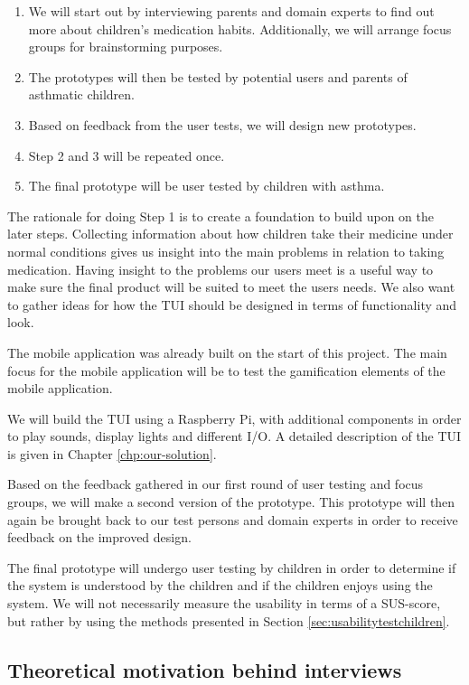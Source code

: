 \begin{enumerate}
  \item We will start out by interviewing parents and domain experts to find out more about children's medication habits. Additionally, we will arrange focus groups for brainstorming purposes.
  \item The prototypes will then be tested by potential users and parents of asthmatic children. 
  \item Based on feedback from the user tests, we will design new prototypes.
  \item Step 2 and 3 will be repeated once. 
  \item The final prototype will be user tested by children with asthma. 
\end{enumerate}
  
The rationale for doing Step 1 is to create a foundation to build upon on the later steps. 
Collecting information about how children take their medicine under normal conditions gives us insight into the main problems in relation to taking medication. Having insight to the problems our users meet is a useful way to make sure the final product will be suited to meet the users needs. We also want to gather ideas for how the TUI should be designed in terms of functionality and look.

The mobile application was already built on the start of this project. The main focus for the mobile application will be to test the gamification elements of the mobile application. 

We will build the TUI using a Raspberry Pi, with additional components in order to play sounds, display lights and different I/O. A detailed description of the TUI is given in Chapter \ref{chp:our-solution}. 


Based on the feedback gathered in our first round of user testing and focus groups, we will make a second version of the prototype. This prototype will then again be brought back to our test persons and domain experts in order to receive feedback on the improved design.

The final prototype will undergo user testing by children in order to determine if the system is understood by the children and if the children enjoys using the system. We will not necessarily measure the usability in terms of a SUS-score\cite{brooke1996sus}, but rather by using the methods presented in Section \ref{sec:usabilitytestchildren}.

\subsection{Theoretical motivation behind interviews}

